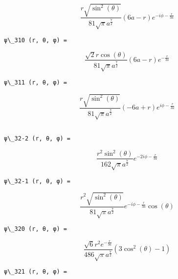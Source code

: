 \documentclass[11pt]{article}
\begin{document}
    $$\frac{r \sqrt{\sin^{2}{\left (\theta \right )}}}{81 \sqrt{\pi} a^{\frac{7}{2}}} \left(6 a - r\right) e^{- i \phi - \frac{r}{3 a}}$$

    
    \begin{Verbatim}[commandchars=\\\{\}]
ψ\_310 (r, θ, φ) =

    \end{Verbatim}

    $$\frac{\sqrt{2} r \cos{\left (\theta \right )}}{81 \sqrt{\pi} a^{\frac{7}{2}}} \left(6 a - r\right) e^{- \frac{r}{3 a}}$$

    
    \begin{Verbatim}[commandchars=\\\{\}]
ψ\_311 (r, θ, φ) =

    \end{Verbatim}

    $$\frac{r \sqrt{\sin^{2}{\left (\theta \right )}}}{81 \sqrt{\pi} a^{\frac{7}{2}}} \left(- 6 a + r\right) e^{i \phi - \frac{r}{3 a}}$$

    
    \begin{Verbatim}[commandchars=\\\{\}]

ψ\_32-2 (r, θ, φ) =

    \end{Verbatim}

    $$\frac{r^{2} \sin^{2}{\left (\theta \right )}}{162 \sqrt{\pi} a^{\frac{7}{2}}} e^{- 2 i \phi - \frac{r}{3 a}}$$

    
    \begin{Verbatim}[commandchars=\\\{\}]
ψ\_32-1 (r, θ, φ) =

    \end{Verbatim}

    $$\frac{r^{2} \sqrt{\sin^{2}{\left (\theta \right )}}}{81 \sqrt{\pi} a^{\frac{7}{2}}} e^{- i \phi - \frac{r}{3 a}} \cos{\left (\theta \right )}$$

    
    \begin{Verbatim}[commandchars=\\\{\}]
ψ\_320 (r, θ, φ) =

    \end{Verbatim}

    $$\frac{\sqrt{6} r^{2} e^{- \frac{r}{3 a}}}{486 \sqrt{\pi} a^{\frac{7}{2}}} \left(3 \cos^{2}{\left (\theta \right )} - 1\right)$$

    
    \begin{Verbatim}[commandchars=\\\{\}]
ψ\_321 (r, θ, φ) =

    \end{Verbatim}
\end{document}
